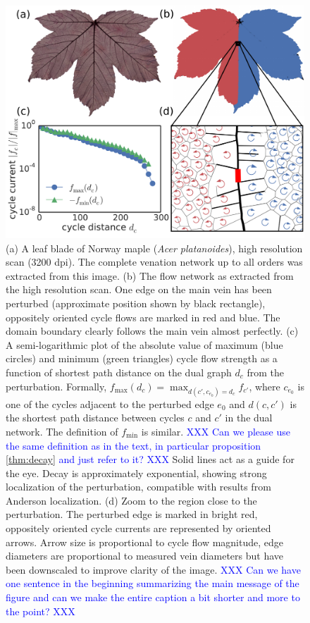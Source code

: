 \documentclass[10pt,aps,pra,twocolumn,superscriptaddress]{revtex4-1}
\newcommand{\dirk}[1]{\textcolor{blue}{#1}}
\begin{document}
\begin{figure}
    \includegraphics[width=.9\columnwidth]{pics/figure_simulations.pdf}
    \caption{(a) A leaf blade of Norway maple (\emph{Acer platanoides}),
    high resolution scan (3200 dpi). The complete venation network
    up to all orders was extracted from this image.
    (b) The flow network as extracted from the high resolution scan.
    One edge on the main vein has been perturbed (approximate position
    shown by black rectangle),
    oppositely oriented cycle flows are marked in red and blue.
    The domain boundary clearly follows the main vein almost perfectly.
    (c) A semi-logarithmic plot of the absolute value of maximum (blue
    circles) and minimum (green triangles) cycle flow strength as a 
    function of shortest path distance
    on the dual graph $d_c$ from the perturbation. Formally,
    $f_\mathrm{max}(d_c) = \operatorname{max}_{d(c', c_{e_0}) = d_c}
    f_{c'}$, where $c_{e_0}$ is one of the cycles adjacent to the 
    perturbed edge $e_0$ and $d(c,c')$ is the shortest path distance
    between cycles $c$ and $c'$ in the dual network. 
    The definition of $f_\mathrm{min}$ is similar.
    \dirk{XXX Can we please use the same definition as in the text, in particular
    proposition \ref{thm:decay} and just refer to it? XXX}
    Solid lines act as a guide for the eye.
    Decay is approximately exponential, showing strong localization 
    of the perturbation,
    compatible with results from Anderson localization.
    (d) Zoom to the region close to the perturbation. The perturbed edge
    is marked in bright red, oppositely oriented cycle currents are
    represented by oriented arrows. Arrow size is proportional to
    cycle flow magnitude, edge diameters are proportional to measured
    vein diameters but have been downscaled to improve clarity of the
    image.
    \dirk{XXX Can we have one sentence in the beginning summarizing the 
    main message of the figure and can we make the entire caption a bit shorter
    and more to the point? XXX}
    \label{fig:vascular-network}}
\end{figure}
\end{document}
